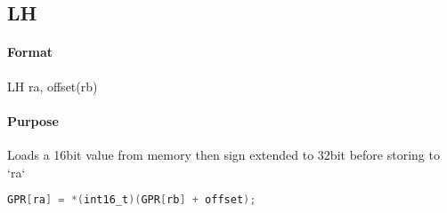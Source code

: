 \subsection{LH}


\paragraph{Format} LH ra, offset(rb)

\paragraph{Purpose} Loads a 16bit value from memory then sign extended to 32bit before storing to `ra`

\begin{lstlisting}[language=C]
    GPR[ra] = *(int16_t)(GPR[rb] + offset);
\end{lstlisting}